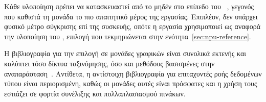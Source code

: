 Κάθε υλοποίηση πρέπει να κατασκευαστεί από το μηδέν στο επίπεδο του
~\cite{mliraie}, γεγονός που καθιστά τη μονάδα το πιο απαιτητικό
μέρος της εργασίας. Επιπλέον, δεν υπάρχει φυσικό μέτρο σύγκρισης επί της
συσκευής, οπότε η εργασία χρησιμοποιεί ως αναφορά την υλοποίηση του ,
επιλογή που τεκμηριώνεται στην ενότητα~\ref{sec:npu-reference}.

Η βιβλιογραφία για την επιλογή  σε μονάδες γραφικών είναι συνολικά
εκτενής και καλύπτει τόσο δίκτυα ταξινόμησης, όσο και μεθόδους βασισμένες στην
αναπαράσταση~\cite{sismanis2012,lin2026adaptivetopk}. Αντίθετα, η αντίστοιχη
βιβλιογραφία για επιταχυντές ροής δεδομένων τύπου  είναι περιορισμένη,
καθώς οι μονάδες αυτές είναι πρόσφατες και η χρήση τους εστιάζει σε φορτία
συνέλιξης και πολλαπλασιασμού πινάκων.
